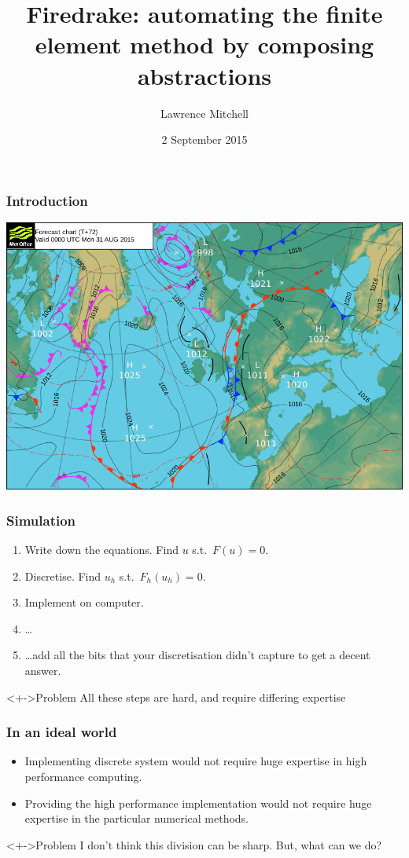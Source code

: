 \documentclass[presentation]{beamer}
\institute{Departments of Computing and Mathematics, Imperial College London}
\author{Lawrence Mitchell}
\date{2 September 2015}
\title{Firedrake: automating the finite element method by composing
  abstractions}
\begin{document}
\maketitle

\begin{frame}
  \frametitle{Introduction}
  \begin{center}
    \includegraphics[width=\textwidth]{09-03-ParCo-firedrake-overview.figures/pressure}
  \end{center}
\end{frame}

\begin{frame}
  \frametitle{Simulation}
  \begin{enumerate}[<+->]
  \item Write down the equations.  Find $u$ s.t.\ $F(u) = 0$.
  \item Discretise.  Find $u_h$ s.t.\ $F_h(u_h) = 0$.
  \item Implement on computer.
  \item \ldots{}
  \item \ldots{}add all the bits that your discretisation didn't capture to
    get a decent answer.
  \end{enumerate}

  \begin{block}<+->{Problem}
    All these steps are hard, and require differing expertise
  \end{block}
\end{frame}

\begin{frame}
  \frametitle{In an ideal world}
  
  \begin{itemize}[<+->]
  \item Implementing discrete system would not require huge expertise
    in high performance computing.
  \item Providing the high performance implementation would not
    require huge expertise in the particular numerical methods.
  \end{itemize}

  \begin{block}<+->{Problem}
    I don't think this division can be sharp.  But, what can we do?
  \end{block}
\end{frame}
\end{document}
